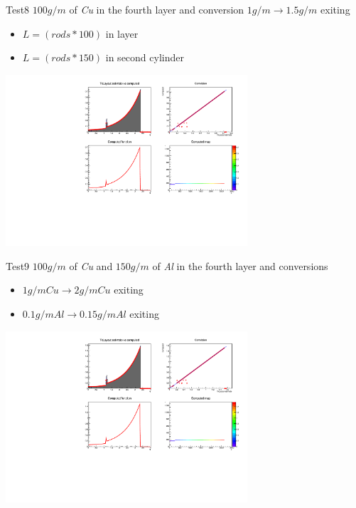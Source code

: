 \documentclass[pdftex, 11pt]{beamer}
\begin{document}
\begin{frame}
  \begin{block}{Test8}
    \alert{$100 g/m$} of \emph{Cu} in the fourth layer and conversion \alert{$1g/m\to 1.5g/m$ exiting}
    \begin{itemize}
    \item \alert{$L=(rods*100)$} in layer
    \item \alert{$L=(rods*150)$} in second cylinder
    \end{itemize}
  \end{block}
  \begin{center}
    \includegraphics[width=9cm]{img/test8.pdf}
  \end{center}
\end{frame}

\begin{frame}
  \begin{block}{Test9}
    \alert{$100 g/m$} of \emph{Cu} and \alert{$150 g/m$} of \emph{Al} in the fourth layer and conversions
    \begin{itemize}
    \item \alert{$1g/m Cu\to 2g/m Cu$} exiting
    \item \alert{$0.1g/m Al\to 0.15g/m Al$} exiting
    \end{itemize}
  \end{block}
  \begin{center}
    \includegraphics[width=9cm]{img/test9.pdf}
  \end{center}
\end{frame}
\end{document}
